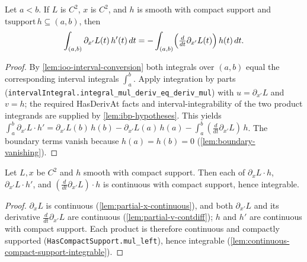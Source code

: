 \begin{lemma}
    \label{lem:integration-by-parts}
    \leanok
    Let $a < b$. If $L$ is $C^2$, $x$ is $C^2$, and $h$ is smooth with compact
    support and $\mathrm{tsupport}\, h \subseteq (a,b)$, then
    \[
      \int_{(a,b)} \partial_{x'} L(t)\, h'(t)\, dt
        = - \int_{(a,b)} \Bigl(\tfrac{d}{dt}\partial_{x'} L(t)\Bigr)\, h(t)\, dt .
    \]
\end{lemma}
\begin{proof}
    By \cref{lem:ioo-interval-conversion} both integrals over $(a,b)$ equal the
    corresponding interval integrals $\int_a^b$. Apply integration by parts
    (\texttt{intervalIntegral.integral\_mul\_deriv\_eq\_deriv\_mul}) with
    $u = \partial_{x'} L$ and $v = h$; the required HasDerivAt facts and
    interval-integrability of the two product integrands are supplied by
    \cref{lem:ibp-hypotheses}. This yields
    $\int_a^b \partial_{x'} L \cdot h' = \partial_{x'} L(b)\, h(b)
      - \partial_{x'} L(a)\, h(a) - \int_a^b (\tfrac{d}{dt}\partial_{x'} L)\, h$.
    The boundary terms vanish because $h(a) = h(b) = 0$
    (\cref{lem:boundary-vanishing}).
\end{proof}

\begin{lemma}
    \label{lem:weak-el-integrands-integrable}
    \leanok
    Let $L, x$ be $C^2$ and $h$ smooth with compact support. Then each of
    $\partial_x L\cdot h$, $\partial_{x'} L\cdot h'$, and
    $(\tfrac{d}{dt}\partial_{x'} L)\cdot h$ is continuous with compact support,
    hence integrable.
\end{lemma}
\begin{proof}
    $\partial_x L$ is continuous (\cref{lem:partial-x-continuous}), and both
    $\partial_{x'} L$ and its derivative $\tfrac{d}{dt}\partial_{x'} L$ are
    continuous (\cref{lem:partial-v-contdiff}); $h$ and $h'$ are continuous with
    compact support. Each product is therefore continuous and compactly supported
    (\texttt{HasCompactSupport.mul\_left}), hence integrable
    (\cref{lem:continuous-compact-support-integrable}).
\end{proof}

